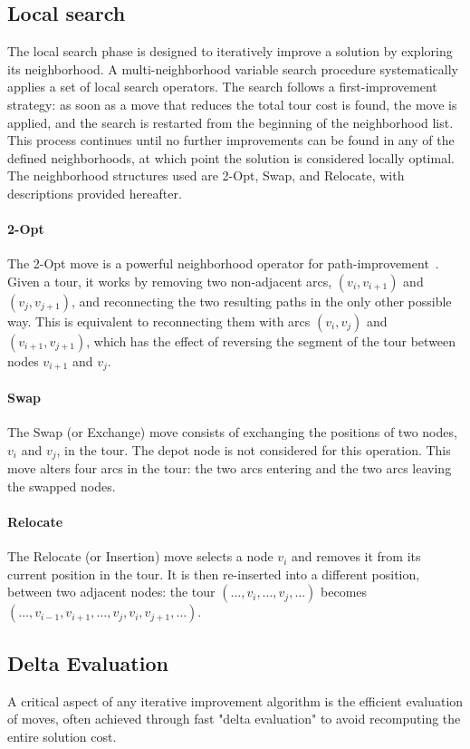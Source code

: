 \documentclass[twocolumn, switch]{article} %
\begin{document}
\subsection{Local search}
The local search phase is designed to iteratively improve a solution by exploring its neighborhood. A multi-neighborhood variable search procedure systematically applies a set of local search operators. The search follows a first-improvement strategy: as soon as a move that reduces the total tour cost is found, the move is applied, and the search is restarted from the beginning of the neighborhood list.
This process continues until no further improvements can be found in any of the defined neighborhoods, at which point the solution is considered locally optimal. The neighborhood structures used are 2-Opt, Swap, and Relocate, with descriptions provided hereafter.

\paragraph{2-Opt} The 2-Opt move is a powerful neighborhood operator for path-improvement~\cite{Croes1958}. Given a tour, it works by removing two non-adjacent arcs, $(v_i, v_{i+1})$ and $(v_j, v_{j+1})$, and reconnecting the two resulting paths in the only other possible way. This is equivalent to reconnecting them with arcs $(v_i, v_j)$ and $(v_{i+1}, v_{j+1})$, which has the effect of reversing the segment of the tour between nodes $v_{i+1}$ and $v_j$.

\paragraph{Swap} The Swap (or Exchange) move consists of exchanging the positions of two nodes, $v_i$ and $v_j$, in the tour. The depot node is not considered for this operation. This move alters four arcs in the tour: the two arcs entering and the two arcs leaving the swapped nodes.

\paragraph{Relocate} The Relocate (or Insertion) move selects a node $v_i$ and removes it from its current position in the tour. It is then re-inserted into a different position, between two adjacent nodes:
the tour $(\ldots, v_i, \ldots, v_j, \ldots)$ becomes $(\ldots, v_{i-1}, v_{i+1}, \ldots, v_j, v_i, v_{j+1}, \ldots)$.

\subsection{Delta Evaluation}
A critical aspect of any iterative improvement algorithm is the efficient evaluation of moves, often achieved through fast "delta evaluation" to avoid recomputing the entire solution cost.
\end{document}
